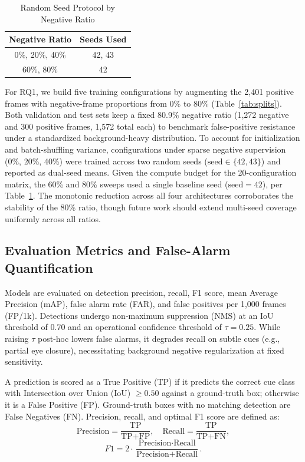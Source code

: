 \documentclass[conference]{IEEEtran}
\begin{document}
\begin{table}[htbp]
\caption{Random Seed Protocol by Negative Ratio}
\label{tab:seeds}
\begin{center}
\begin{tabular}{|c|c|}
\hline
\textbf{Negative Ratio} & \textbf{Seeds Used} \\
\hline
0\%, 20\%, 40\% & 42, 43 \\
60\%, 80\%      & 42 \\
\hline
\end{tabular}
\end{center}
\end{table}

For RQ1, we build five training configurations by augmenting the 2,401 positive frames with negative-frame proportions from 0\% to 80\% (Table~\ref{tab:splits}). Both validation and test sets keep a fixed 80.9\% negative ratio (1,272 negative and 300 positive frames, 1,572 total each) to benchmark false-positive resistance under a standardized background-heavy distribution. To account for initialization and batch-shuffling variance, configurations under sparse negative supervision (0\%, 20\%, 40\%) were trained across two random seeds ($\text{seed} \in \{42, 43\}$) and reported as dual-seed means. Given the compute budget for the 20-configuration matrix, the 60\% and 80\% sweeps used a single baseline seed ($\text{seed} = 42$), per Table~\ref{tab:seeds}. The monotonic reduction across all four architectures corroborates the stability of the 80\% ratio, though future work should extend multi-seed coverage uniformly across all ratios.

\subsection{Evaluation Metrics and False-Alarm Quantification}
\label{subsec:metrics}
Models are evaluated on detection precision, recall, F1 score, mean Average Precision (mAP), false alarm rate (FAR), and false positives per 1,000 frames (FP/1k). Detections undergo non-maximum suppression (NMS) at an IoU threshold of 0.70 and an operational confidence threshold of $\tau = 0.25$. While raising $\tau$ post-hoc lowers false alarms, it degrades recall on subtle cues (e.g., partial eye closure), necessitating background negative regularization at fixed sensitivity.

A prediction is scored as a True Positive (TP) if it predicts the correct cue class with Intersection over Union (IoU) $\ge 0.50$ against a ground-truth box; otherwise it is a False Positive (FP). Ground-truth boxes with no matching detection are False Negatives (FN). Precision, recall, and optimal F1 score are defined as:
\begin{equation}
\text{Precision} = \frac{\text{TP}}{\text{TP} + \text{FP}}, \quad \text{Recall} = \frac{\text{TP}}{\text{TP} + \text{FN}},
\label{eq:precision_recall}
\end{equation}
\begin{equation}
F1 = 2 \cdot \frac{\text{Precision} \cdot \text{Recall}}{\text{Precision} + \text{Recall}}.
\label{eq:f1}
\end{equation}
\end{document}
